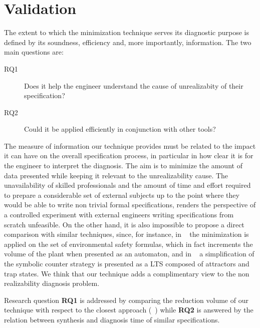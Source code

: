 \section{Validation}\label{sec:validation}
The extent to which the minimization technique serves its diagnostic purpose is defined by its soundness, efficiency and, more importantly, information. 
The two main questions are:
\begin{description}
	\item[RQ1] Does it help the engineer understand the cause of unrealizabity of their specification?
	\item[RQ2] Could it be applied efficiently in conjunction with other tools?	
\end{description}



The measure of information our technique provides must be related to the impact it can have on the overall specification process, in particular in how clear it is for the engineer  to interpret the diagnosis. The aim is to minimize the amount of data presented while keeping it relevant to the unrealizability cause. The unavailability of skilled professionals and the amount of time and effort required to prepare a considerable set of external subjects up to the point where they would be able to write non trivial formal specifications, renders the perspective of a controlled experiment with external engineers writing specifications from scratch unfeasible. On the other hand, it is also impossible to propose a direct comparison with similar techniques, since, for instance, in ~\cite{DBLP:conf/hvc/KonighoferHB10} the minimization is applied on the set of environmental safety formulas, which in fact increments the volume of the plant when presented as an automaton, and in ~\cite{DBLP:conf/sigsoft/KuventMR17} a simplification of the symbolic counter strategy is presented as a LTS composed of attractors and trap states. We think that our technique adds a complimentary view to the non realizability diagnosis problem.

Research question \textbf{RQ1} is addressed by comparing the reduction volume of our technique with respect to the closest approach (~\cite{DBLP:conf/hvc/KonighoferHB10}) while \textbf{RQ2} is answered by the relation between synthesis and diagnosis time of similar specifications.


